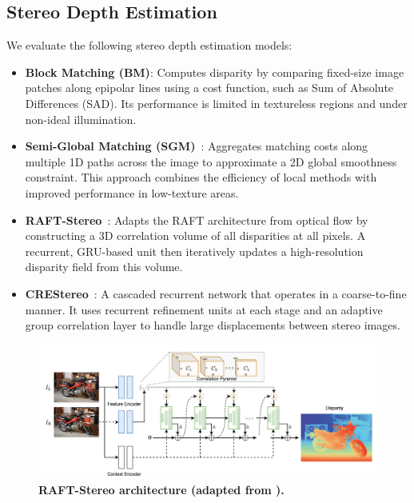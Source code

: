 \subsection{Stereo Depth Estimation}
We evaluate the following stereo depth estimation models:
\label{sec:stereo_depth_estimation}
\begin{itemize}
	\item \textbf{Block Matching (BM)}: Computes disparity by comparing fixed-size image patches along epipolar lines using a cost function, such as Sum of Absolute Differences (SAD). Its performance is limited in textureless regions and under non-ideal illumination.

	\item \textbf{Semi-Global Matching (SGM)}~\cite{hirschmuller_stereo_2008}: Aggregates matching costs along multiple 1D paths across the image to approximate a 2D global smoothness constraint. This approach combines the efficiency of local methods with improved performance in low-texture areas.

	\item \textbf{RAFT-Stereo}~\cite{lipson_raft-stereo_2021}: Adapts the RAFT architecture from optical flow by constructing a 3D correlation volume of all disparities at all pixels. A recurrent, GRU-based unit then iteratively updates a high-resolution disparity field from this volume.

	\item \textbf{CREStereo}~\cite{li_practical_2022}: A cascaded recurrent network that operates in a coarse-to-fine manner. It uses recurrent refinement units at each stage and an adaptive group correlation layer to handle large displacements between stereo images.
\end{itemize}

\begin{figure}[t]
	\centering
	\includegraphics[width=\linewidth]{figures/raft_stereo.png}
	\caption{\bfseries RAFT-Stereo architecture (adapted from \cite{lipson_raft-stereo_2021}).}
	\label{fig:raft_stereo}
\end{figure}

